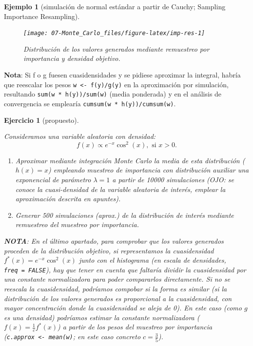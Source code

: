 \documentclass[
]{book}
\theoremstyle{break}
\newtheorem{exercise}{Ejercicio}[chapter]
\newtheorem{example}{Ejemplo}[chapter]
\theoremstyle{nonumberplain}
\begin{document}
\begin{example}[simulación de normal estándar a partir de Cauchy; Sampling Importance Resampling]
\begin{figure}[!htb]

{\centering \texttt{[image: 07-Monte\_Carlo\_files/figure-latex/imp-res-1]} 

}

\caption{Distribución de los valores generados mediante remuestreo por importancia y densidad objetivo.}\label{fig:imp-res}
\end{figure}

\end{example}

\textbf{Nota}: Si f o g fuesen cuasidensidades y se pidiese aproximar la integral, habría que reescalar los pesos \texttt{w\ \textless{}-\ f(y)/g(y)} en la aproximación por simulación, resultando \texttt{sum(w\ *\ h(y))/sum(w)} (media ponderada) y en el análisis de convergencia se emplearía \texttt{cumsum(w\ *\ h(y))/cumsum(w)}.

\begin{exercise}[propuesto]
\protect\hypertarget{exr:mc-imp-sample2}{}\label{exr:mc-imp-sample2}

Consideramos una variable aleatoria con densidad:
\[f(x)\propto e^{-x}\cos^{2}(x),\text{ si }x>0.\]

\begin{enumerate}
\def\labelenumi{\alph{enumi}.}
\item
  Aproximar mediante integración Monte Carlo la media de esta
  distribución (\(h(x)=x\)) empleando muestreo de importancia con
  distribución auxiliar una exponencial de parámetro \(\lambda=1\) a
  partir de 10000 simulaciones (OJO: se conoce la cuasi-densidad
  de la variable aleatoria de interés, emplear la aproximación descrita
  en apuntes).
\item
  Generar 500 simulaciones (aprox.) de la distribución de interés
  mediante remuestreo del muestreo por importancia.
\end{enumerate}

\textbf{NOTA}: En el último apartado, para comprobar que los valores generados proceden de la distribución objetivo, si representamos la cuasidensidad \(f^{\ast}(x) = e^{-x}\cos^{2}(x)\) junto con el histograma (en escala de densidades, \texttt{freq\ =\ FALSE}), hay que tener en cuenta que faltaría dividir la cuasidensidad por una constante normalizadora para poder compararlos directamente.
Si no se reescala la cuasidensidad, podríamos compobar si la forma es similar (si la distribución de los valores generados es proporcional a la cuasidensidad, con mayor concentración donde la cuasidensidad se aleja de 0).
En este caso (como \(g\) es una densidad) podríamos estimar la constante normalizadora (\(f(x) = \frac{1}{c}f^{\ast}(x)\)) a partir de los pesos del muestreo por importancia (\texttt{c.approx\ \textless{}-\ mean(w)}; en este caso concreto \(c=\frac{3}{5}\)).
\end{exercise}
\end{document}
